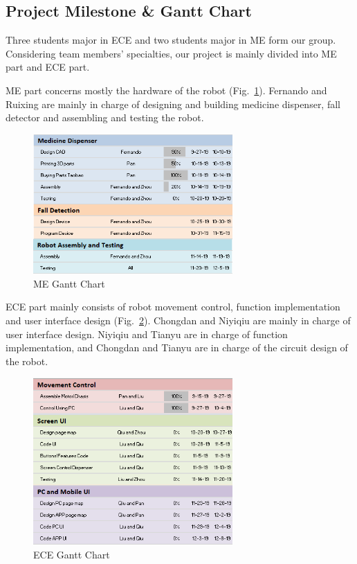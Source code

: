 \documentclass[12pt]{article}
\begin{document}
\subsection{Project Milestone \& Gantt Chart}
Three students major in ECE and two students major in ME form our group. Considering team members' specialties, our project is mainly divided into ME part and ECE part.\par 
ME part concerns mostly the hardware of the robot (Fig.~\ref{fig::megantt}). Fernando and Ruixing are mainly in charge of designing and building medicine dispenser, fall detector and assembling and testing the robot.\par
\begin{figure}[H]
	
	\centering
	\includegraphics[width=3in]{ganttA.png}
	\caption{ME Gantt Chart}
	\label{fig::megantt}

\end{figure}
ECE part mainly consists of robot movement control, function implementation and user interface design (Fig.~\ref{fig::ecegantt}). Chongdan and Niyiqiu are mainly in charge of user interface design. Niyiqiu and Tianyu are in charge of function implementation, and Chongdan and Tianyu are in charge of the circuit design of the robot.
\begin{figure}[H]
	
	\centering
	\includegraphics[width=3in]{ganttB.png}
	\caption{ECE Gantt Chart}
	\label{fig::ecegantt}

\end{figure}
\end{document}
